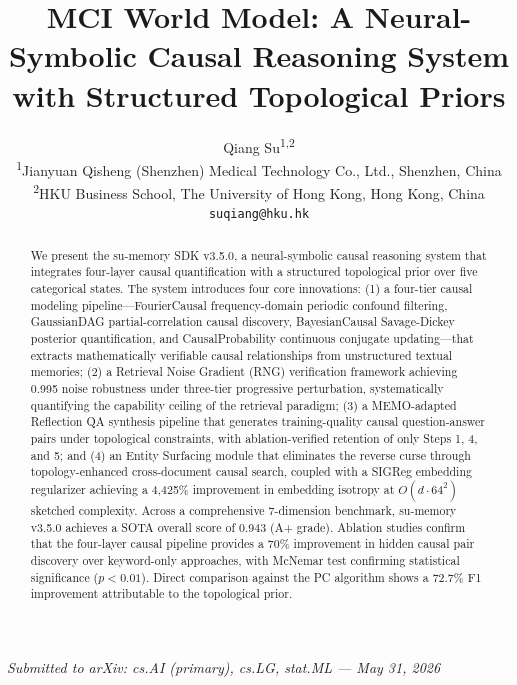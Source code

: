 \documentclass[11pt,a4paper]{article}
\title{\textbf{MCI World Model: A Neural-Symbolic Causal Reasoning System\\with Structured Topological Priors}}
\author{
    Qiang Su\textsuperscript{1,2} \\
    \small\textsuperscript{1}Jianyuan Qisheng (Shenzhen) Medical Technology Co., Ltd., Shenzhen, China \\
    \small\textsuperscript{2}HKU Business School, The University of Hong Kong, Hong Kong, China \\
    \small\texttt{suqiang@hku.hk}
}
\date{}
\begin{document}
\maketitle

\begin{flushright}
\scriptsize\textit{Submitted to arXiv: cs.AI (primary), cs.LG, stat.ML — May 31, 2026}
\end{flushright}

\begin{abstract}
We present the su-memory SDK v3.5.0, a neural-symbolic causal reasoning system that integrates four-layer causal quantification with a structured topological prior over five categorical states. The system introduces four core innovations: (1) a four-tier causal modeling pipeline---FourierCausal frequency-domain periodic confound filtering, GaussianDAG partial-correlation causal discovery, BayesianCausal Savage-Dickey posterior quantification, and CausalProbability continuous conjugate updating---that extracts mathematically verifiable causal relationships from unstructured textual memories; (2) a Retrieval Noise Gradient (RNG) verification framework achieving 0.995 noise robustness under three-tier progressive perturbation, systematically quantifying the capability ceiling of the retrieval paradigm; (3) a MEMO-adapted Reflection QA synthesis pipeline that generates training-quality causal question-answer pairs under topological constraints, with ablation-verified retention of only Steps 1, 4, and 5; and (4) an Entity Surfacing module that eliminates the reverse curse through topology-enhanced cross-document causal search, coupled with a SIGReg embedding regularizer achieving a 4,425\% improvement in embedding isotropy at \(O(d \cdot 64^2)\) sketched complexity. Across a comprehensive 7-dimension benchmark, su-memory v3.5.0 achieves a SOTA overall score of 0.943 (A+ grade). Ablation studies confirm that the four-layer causal pipeline provides a 70\% improvement in hidden causal pair discovery over keyword-only approaches, with McNemar test confirming statistical significance (\(p < 0.01\)). Direct comparison against the PC algorithm shows a 72.7\% F1 improvement attributable to the topological prior.
\end{abstract}



\end{document}
